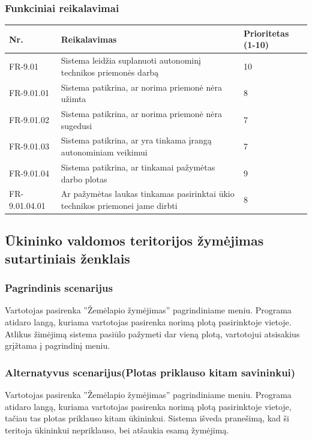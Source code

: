 \documentclass[oneside]{VUMIFPSkursinis}
\begin{document}
\subsubsection{Funkciniai reikalavimai}
\begin{table}[htbp]
	\begin{tabularx}{1\textwidth}{ |P{2.5cm}|X|P{3cm }| }  \hline
    Nr. & Reikalavimas &  Prioritetas (1-10)  \\   \hline 
    FR-9.01 & Sistema leidžia suplanuoti autonominį technikos priemonės darbą & 10  \\   \hline
		FR-9.01.01 & Sistema patikrina, ar norima priemonė nėra užimta & 8  \\ \hline
		FR-9.01.02 & Sistema patikrina, ar norima priemonė nėra sugedusi & 7 \\ \hline
		FR-9.01.03 & Sistema patikrina, ar yra tinkama įrangą autonominiam veikimui & 7 \\  \hline
		FR-9.01.04 & Sistema patikrina, ar tinkamai pažymėtas darbo plotas & 9  \\ \hline
	FR-9.01.04.01 & Ar pažymėtas laukas tinkamas pasirinktai ūkio technikos priemonei jame dirbti & 8 \\ \hline
	\end{tabularx}
\end{table}

\subsection{Ūkininko valdomos teritorijos žymėjimas sutartiniais ženklais}
	\subsubsection{Pagrindinis scenarijus}
	Vartotojas pasirenka ''Žemėlapio žymėjimas'' pagrindiniame meniu. Programa atidaro langą, kuriama vartotojas pasirenka norimą plotą pasirinktoje vietoje. Atlikus žimėjimą sistema pasiūlo pažymeti dar vieną plotą, vartotojui atsisakius grįžtama į pagrindinį meniu.
	\subsubsection{Alternatyvus scenarijus(Plotas priklauso kitam savininkui)}
	Vartotojas pasirenka ''Žemėlapio žymėjimas'' pagrindiniame meniu. Programa atidaro langą, kuriama vartotojas pasirenka norimą plotą pasirinktoje vietoje, tačiau tas plotas priklauso kitam ūkininkui. Sistema išveda pranešimą, kad ši teritoja ūkininkui nepriklauso, bei atšaukia esamą žymėjimą.
\end{document}
